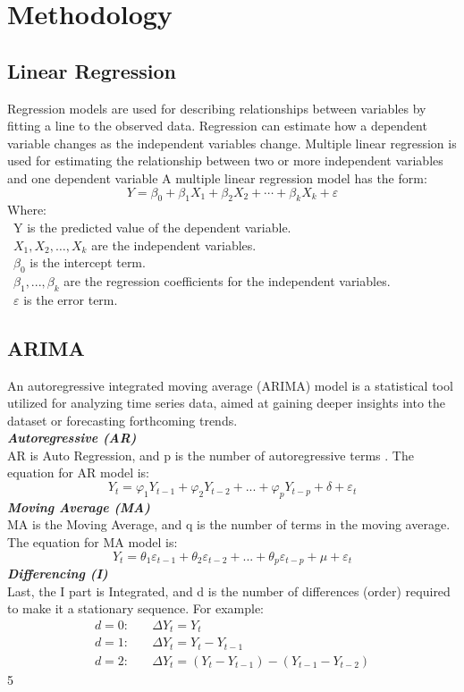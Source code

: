 \documentclass{ieeeojies}
\begin{document}
\section{Methodology}
\subsection{Linear Regression} 
Regression models are used for describing relationships between variables by fitting a line to the observed data. Regression can estimate how a dependent variable changes as the independent variables change. Multiple linear regression is used for estimating the relationship between two or more independent variables and one dependent variable 
A multiple linear regression model has the form: \cite{b7}
\[Y=\beta_0+\beta_1X_1+\beta_2X_2+\cdots+\beta_kX_k+\varepsilon\]
Where:\\
	\indent\textbullet\ Y is the predicted value of the dependent variable.\\
	\indent\textbullet\ \(X_1, X_2, \ldots, X_k\) are the independent variables.\\
	\indent\textbullet\ \(\beta_0\) is the intercept term.\\
	\indent\textbullet\ \(\beta_1,..., \beta_k\) are the regression coefficients for the independent variables.\\
	\indent\textbullet\ \(\varepsilon\) is the error term.    

 \subsection{ARIMA} 
An autoregressive integrated moving average (ARIMA) model is a statistical tool utilized for analyzing time series data, aimed at gaining deeper insights into the dataset or forecasting forthcoming trends. \cite{b8}
\\
\textit{\textbf{Autoregressive (AR)}}
\\
AR is Auto Regression, and p is the number of autoregressive terms . The equation for AR model is: 
\[
Y_t = \varphi_1Y_{t-1} + \varphi_2Y_{t-2} + ... + \varphi_pY_{t-p} + \delta + \varepsilon_t
\]
\textit{\textbf{Moving Average (MA)}}
\\
MA is the Moving Average, and q is the number of terms in the moving average. The equation for MA model is:  
\[
Y_t = \theta_1\varepsilon_{t-1} + \theta_2\varepsilon_{t-2} + ... + \theta_p\varepsilon_{t-p} + \mu + \varepsilon_t  
\]
\textit{\textbf{Differencing (I) }}
\\
Last, the I part is Integrated, and d is the number of differences (order) required to make it a stationary sequence. For example:
\begin{align*}
    d=0: & \quad \Delta Y_t = Y_t \\
    d=1: & \quad \Delta Y_t = Y_t - Y_{t-1} \\
    d=2: & \quad \Delta Y_t = \left(Y_t - Y_{t-1}\right) - \left(Y_{t-1} - Y_{t-2}\right)
\end{align*}5
\end{document}
